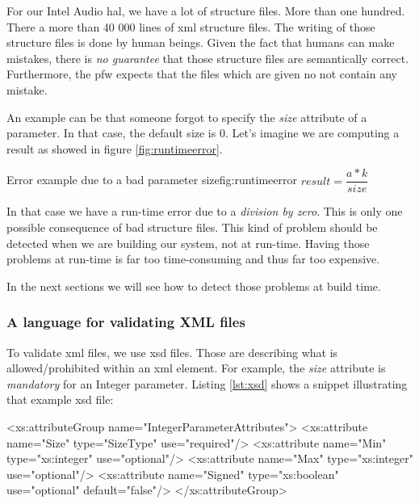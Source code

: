 For our Intel Audio \gls{hal}, we have a lot of structure files. More than one hundred.
There a more than 40 000 lines of \gls{xml} structure files.
The writing of those structure files is done by human beings. Given the fact
that humans can make mistakes, there is \emph{no guarantee} that those structure files are semantically correct.
Furthermore, the \gls{pfw} expects that the files which are given no not contain any mistake.

An example can be that someone forgot to specify the \emph{size} attribute of a parameter.
In that case, the default size is $0$. Let's imagine we are computing a result as showed in figure \ref{fig:runtimeerror}.

\begin{figureGraphics}{Error example due to a bad parameter size}{fig:runtimeerror}
    $result = \dfrac{a*k}{size}$
    \vspace{0.3cm}
\end{figureGraphics}

In that case we have a run-time error due to a \emph{division by zero}. This is only one possible consequence of bad structure files.
This kind of problem should be detected when we are building our system, not at run-time. Having those problems at
run-time is far too time-consuming and thus far too expensive.

In the next sections we will see how to detect those problems at build time.

\subsubsection{A language for validating XML files}

To validate \gls{xml} files, we use \gls{xsd} files.
Those are describing what is allowed/prohibited within an \gls{xml} element. For example, the \emph{size} attribute is
\emph{mandatory} for an Integer parameter.
Listing \ref{lst:xsd} shows a snippet illustrating that example \gls{xsd} file:

\begin{code}[language=XML, caption=XSD rules for an Integer parameter, label=lst:xsd]
<xs:attributeGroup name="IntegerParameterAttributes">
    <xs:attribute name="Size" type="SizeType" use="required"/>
    <xs:attribute name="Min" type="xs:integer" use="optional"/>
    <xs:attribute name="Max" type="xs:integer" use="optional"/>
    <xs:attribute name="Signed" type="xs:boolean" use="optional" default="false"/>
</xs:attributeGroup>
\end{code}

